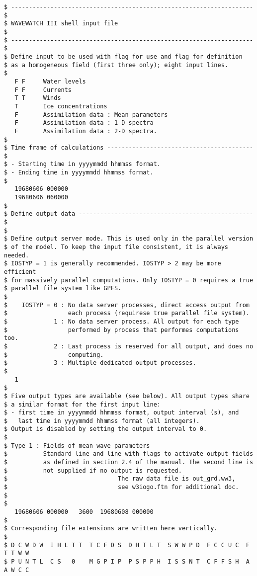 \begin{verbatim}
$ -------------------------------------------------------------------- $
$ WAVEWATCH III shell input file                                       $
$ -------------------------------------------------------------------- $
$ Define input to be used with flag for use and flag for definition
$ as a homogeneous field (first three only); eight input lines.
$
   F F     Water levels
   F F     Currents
   T T     Winds
   T       Ice concentrations
   F       Assimilation data : Mean parameters
   F       Assimilation data : 1-D spectra
   F       Assimilation data : 2-D spectra.
$
$ Time frame of calculations ----------------------------------------- $
$ - Starting time in yyyymmdd hhmmss format.
$ - Ending time in yyyymmdd hhmmss format.
$
   19680606 000000
   19680606 060000
$
$ Define output data ------------------------------------------------- $
$
$ Define output server mode. This is used only in the parallel version
$ of the model. To keep the input file consistent, it is always needed.
$ IOSTYP = 1 is generally recommended. IOSTYP > 2 may be more efficient
$ for massively parallel computations. Only IOSTYP = 0 requires a true
$ parallel file system like GPFS.
$
$    IOSTYP = 0 : No data server processes, direct access output from
$                 each process (requirese true parallel file system).
$             1 : No data server process. All output for each type 
$                 performed by process that performes computations too.
$             2 : Last process is reserved for all output, and does no
$                 computing.
$             3 : Multiple dedicated output processes.
$
   1
$
$ Five output types are available (see below). All output types share
$ a similar format for the first input line:
$ - first time in yyyymmdd hhmmss format, output interval (s), and 
$   last time in yyyymmdd hhmmss format (all integers).
$ Output is disabled by setting the output interval to 0.
$
$ Type 1 : Fields of mean wave parameters
$          Standard line and line with flags to activate output fields
$          as defined in section 2.4 of the manual. The second line is
$          not supplied if no output is requested.
$                               The raw data file is out_grd.ww3, 
$                               see w3iogo.ftn for additional doc.
$          
$
   19680606 000000   3600  19680608 000000
$
$ Corresponding file extensions are written here vertically.  
$
$ D C W D W  I H L T T  T C F D S  D H T L T  S W W P D  F C C U C  F T T W W  
$ P U N T L  C S   0    M G P I P  P S P P H  I S S N T  C F F S H  A A W C C  

\end{verbatim}
